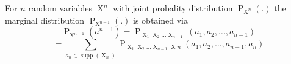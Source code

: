 For $n$ random variables $\operatorname{X}^{n}$ with joint probality distribution $\operatorname{P}_{\operatorname{X}^{n}}(.)$ the marginal distribution $\operatorname{P}_{\operatorname{X}^{n - 1}}(.)$ is obtained via 
$$\operatorname{P}_{\operatorname{X}^{n-1}}(a^{n-1}) = \operatorname{P}_{\operatorname{X}_{1} \operatorname{X}_{2} \dots \operatorname{X}_{n-1}}(a_{1}, a_{2}, \dots, a_{n-1})$$
$$= \sum\limits_{a_{n} \in \operatorname{supp}(\operatorname{X}_{n})} \operatorname{P}_{\operatorname{X}_{1}\operatorname{X}_{2} \dots \operatorname{X}_{n-1}\operatorname{X}n}(a_{1}, a_{2}, \dots, a_{n-1}, a_{n})$$ 



